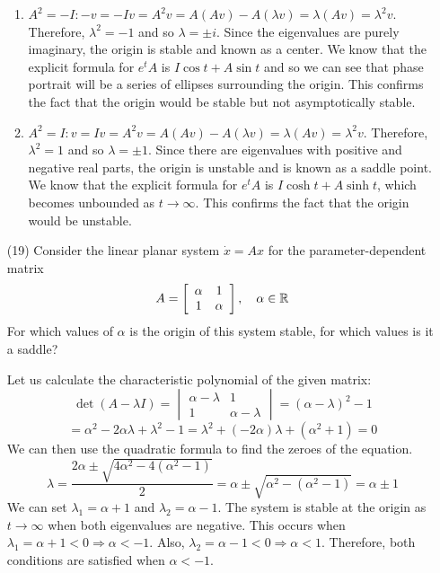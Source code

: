 \documentclass[12pt,letterpaper,reqno]{amsart}
\begin{document}
\begin{enumerate}
\begin{enumerate}
    \item $A^2 = -I : -v = -Iv = A^2v = A(Av) - A(\lambda v) = \lambda(Av) = \lambda^2v$. Therefore, $\lambda^2 = -1$ and so $\lambda = \pm i$. Since the eigenvalues are purely imaginary, the origin is stable and known as a center. We know that the  explicit formula for $e^tA$ is $I\cos{t} +A\sin{t}$ and so we can see that phase portrait will be a series of ellipses surrounding the origin. This confirms the fact that the origin would be stable but not asymptotically stable. \newline
    \item $A^2 = I : v = Iv = A^2v = A(Av) - A(\lambda v) = \lambda(Av) = \lambda^2v$. Therefore, $\lambda^2 = 1$ and so $\lambda = \pm 1$. Since there are eigenvalues with positive and negative real parts, the origin is unstable and is known as a saddle point. We know that the  explicit formula for $e^tA$ is $I\cosh{t} +A\sinh{t}$, which becomes unbounded as $t \rightarrow \infty$. This confirms the fact that the origin would be unstable.
\end{enumerate}
\newpage
\item[(19)] Consider the linear planar system $\dot{x} = Ax$ for the parameter-dependent matrix
$$A = \left[ \begin{array} { c c } { \alpha } & { 1 } \\ { 1 } & { \alpha } \end{array} \right] , \quad \alpha \in \mathbb { R }$$
For which values of $\alpha$ is the origin of this system stable, for which values is it a saddle?\newline
\begin{flushleft}
Let us calculate the characteristic polynomial of the given matrix:
$$\det(A-\lambda I) = \begin{vmatrix} { \alpha - \lambda } & { 1 } \\ { 1 } & { \alpha - \lambda } \end{vmatrix} = (\alpha - \lambda)^2 - 1$$
$$ = \alpha^2 - 2\alpha\lambda + \lambda^2 - 1 = \lambda^2 + (-2\alpha)\lambda + (\alpha^2 + 1) = 0$$
We can then use the quadratic formula to find the zeroes of the equation.
$$\lambda = \frac{2\alpha \pm \sqrt{4\alpha^2 - 4(\alpha^2 -1)}}{2} = \alpha \pm \sqrt{\alpha^2 - (\alpha^2 -1)} = \alpha \pm 1$$
We can set $\lambda_1 = \alpha + 1$ and $\lambda_2 = \alpha - 1$. The system is stable at the origin as $t \rightarrow \infty$ when both eigenvalues are negative. This occurs when $\lambda_1 = \alpha +1 < 0 \Rightarrow \alpha < -1$. Also, $\lambda_2 = \alpha - 1 < 0 \Rightarrow \alpha < 1$. Therefore, both conditions are satisfied when $\alpha < -1$.\newline


\end{flushleft}
\end{enumerate}
\end{document}
